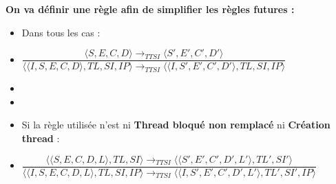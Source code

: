 \documentclass[10pt,a4paper]{report}
\begin{document}
	
	\textbf{On va définir une règle afin de simplifier les règles futures :} 
	\begin{itemize}
		\item[] Dans tous les cas :
		\item[] \begin{center}
			$\dfrac{\langle S,E,C,D\rangle \longrightarrow_{TTSI} \langle S',E',C',D'\rangle}{\langle\langle I,S,E,C,D\rangle,TL,SI,IP\rangle \longrightarrow_{TTSI} \langle\langle I,S',E',C',D'\rangle,TL,SI,IP\rangle}$
		\end{center}
		\item[]
		\item[]
		\item[] Si la règle utilisée n'est ni \textbf{Thread bloqué non remplacé} ni \textbf{Création thread} :
		\smallbreak 
		\item[] \begin{center}
			$\dfrac{\langle\langle S,E,C,D,L\rangle,TL,SI\rangle \longrightarrow_{TTSI} \langle\langle S',E',C',D',L'\rangle,TL',SI'\rangle}{\langle\langle I,S,E,C,D,L\rangle,TL,SI,IP\rangle \longrightarrow_{TTSI} \langle\langle I,S',E',C',D',L'\rangle,TL',SI',IP\rangle}$ 
		\end{center}
	\end{itemize}
	\newpage
	
\end{document}
